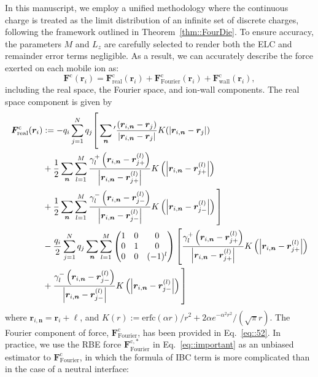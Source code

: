 In this manuscript, we employ a unified methodology where the continuous charge is treated as the limit distribution of an infinite set of discrete charges, following the framework outlined in Theorem~\ref{thm::FourDie}. To ensure accuracy, the parameters $M$ and $L_z$ are carefully selected to render both the ELC and remainder error terms negligible. As a result, we can accurately describe the force exerted on each mobile ion as:
\begin{equation}
\bm{F}^{\text{c}}(\bm{r}_i)=\bm{F}^{\text{c}}_{\text{real}}(\bm{r}_i)+\bm{F}^{\text{c}}_{\text{Fourier}}(\bm{r}_i)+\bm{F}^{\text{c}}_{\text{wall}}(\bm{r}_i),
\end{equation}
including the real space, the Fourier space, and ion-wall components. The real space component is given by
\begin{equation}\label{eq::F_real_detail}
\begin{split}
\bm{F}_{\text{real}}^{\te{c}}(\bm{r}_i)
& := -q_i\sum_{j=1}^{N} q_j \Biggg[\sum_{\bm{n}}{}^\prime \frac{\left(\bm{r}_{i,\bm{n}} - \bm{r}_{j}\right)}{\abs{\bm{r}_{i,\bm{n}} - \bm{r}_{j}}} K(\abs{\bm{r}_{i,\bm{n}} - \bm{r}_{j}}) \\
&+ \frac{1}{2} \sum_{\bm{n}} \sum_{l=1}^{M} \frac{\gamma_{l}^+\left(\bm{r}_{i,\bm{n}}-\bm{r}_{j+}^{(l)}\right)}{\left|\bm{r}_{i,\bm{n}}-\bm{r}_{j+}^{(l)}\right|} K\left(\left|\bm{r}_{i,\bm{n}}-\bm{r}_{j+}^{(l)}\right|\right)\\
&+\frac{1}{2}\sum_{\bm{n}}\sum_{l=1}^{M}\frac{\gamma_{l}^-\left(\bm{r}_{i,\bm{n}}-\bm{r}_{j-}^{(l)}\right)}{\left|\bm{r}_{i,\bm{n}}-\bm{r}_{j-}^{(l)}\right|}K\left(\left|\bm{r}_{i,\bm{n}}-\bm{r}_{j-}^{(l)}\right|\right)\Biggg]\\
&-\frac{q_i}{2}\sum_{j=1}^{N}q_j\sum_{\bm{n}}\sum_{l=1}^{M}\begin{pmatrix}
1&0&0\\
0&1&0\\
0&0&(-1)^l
\end{pmatrix}\Biggg[
\frac{\gamma_{l}^+\left(\bm{r}_{i,\bm{n}}-\bm{r}_{j+}^{(l)}\right)}{\left|\bm{r}_{i,\bm{n}}-\bm{r}_{j+}^{(l)}\right|}K\left(\left|\bm{r}_{i,\bm{n}}-\bm{r}_{j+}^{(l)}\right|\right)\\
&+\frac{\gamma_{l}^-\left(\bm{r}_{i,\bm{n}}-\bm{r}_{j-}^{(l)}\right)}{\left|\bm{r}_{i,\bm{n}}-\bm{r}_{j-}^{(l)}\right|}K\left(\left|\bm{r}_{i,\bm{n}}-\bm{r}_{j-}^{(l)}\right|\right)\Biggg]
\end{split}
\end{equation}
where $\bm{r}_{i,\bm{n}}=\bm{r}_{i}+\bm{\ell}$, and $K(r):=\text{erfc}(\alpha r)/r^2+2\alpha e^{-\alpha^2r^2}/(\sqrt{\pi}r)$. The Fourier component of force, $\bm{F}^{\text{c}}_{\text{Fourier}}$, has been provided in Eq.~\eqref{eq::52}. In practice, we use the RBE force $\bm{F}^{\text{c},*}_{\text{Fourier}}$ in Eq.~\eqref{eq::important} as an unbiased estimator to $\bm{F}^{\text{c}}_{\text{Fourier}}$, in which the formula of IBC term is more complicated than  {in} the case of  {a} neutral interface:
